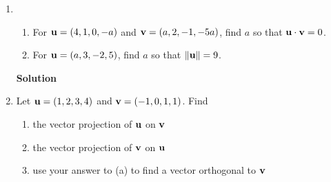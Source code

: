 \begin{enumerate}
\item \begin{enumerate}
\item For ${\bf u}=(4,1,0,-a)$ and ${\bf v}=(a,2,-1,-5a)$,
find $a$ so that ${\bf u} \cdot {\bf v}=0$.
\item For ${\bf u}=(a,3,-2,5)$, find $a$ so that $\|{\bf u}\|=9$.
\end{enumerate}

\noindent \textbf{Solution} 

\item Let ${\bf{u}} = (1, 2, 3, 4)$ and ${\bf{v}} = (-1, 0, 1, 1)$. Find
\begin{enumerate}
\item the vector projection of ${\bf{u}}$ on ${\bf{v}}$
\item the vector projection of ${\bf{v}}$ on ${\bf{u}}$
\item use your answer to (a) to find a vector orthogonal to ${\bf{v}}$
\end{enumerate}


\end{enumerate}
